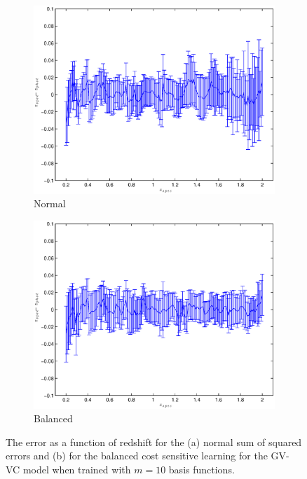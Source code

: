 \documentclass[useAMS,usenatbib,fleqn]{mn2e}
\begin{document}
\begin{figure}
        \centering
        \begin{subfigure}[b]{\columnwidth}
                \includegraphics[width=\textwidth]{figures/Zspec-Zphot_normal.eps}
                \caption{Normal}
                \label{fig-normal}
        \end{subfigure}
	
        \begin{subfigure}[b]{\columnwidth}
                \includegraphics[width=\textwidth]{figures/Zspec-Zphot_balanced.eps}
                \caption{Balanced}
                \label{fig-balanced}
        \end{subfigure}
       \caption{The error as a function of redshift for the (a) normal sum of squared errors and (b) for the balanced cost sensitive learning for the GV-VC model when trained with $m=10$ basis functions.}
	\label{fig-normal-balanced}
\end{figure}
\end{document}
